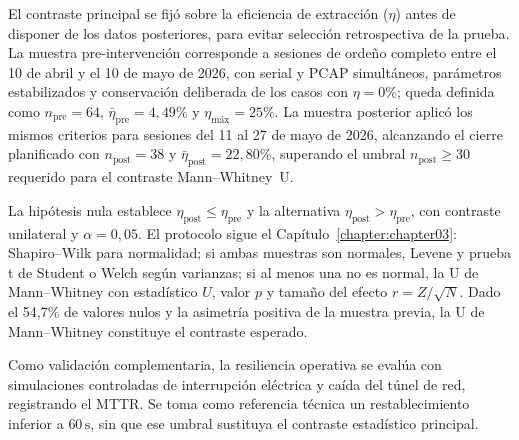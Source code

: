 El contraste principal se fijó sobre la eficiencia de extracción ($\eta$) antes de disponer de los datos posteriores, para evitar selección retrospectiva de la prueba. La muestra pre-intervención corresponde a sesiones de ordeño completo entre el 10 de abril y el 10 de mayo de 2026, con serial y \ac{PCAP} simultáneos, parámetros estabilizados y conservación deliberada de los casos con $\eta = 0\%$; queda definida como $n_{\text{pre}} = 64$, $\bar{\eta}_{\text{pre}} = 4,49\%$ y $\eta_{\text{máx}} = 25\%$. La muestra posterior aplicó los mismos criterios para sesiones del 11 al 27 de mayo de 2026, alcanzando el cierre planificado con $n_{\text{post}} = 38$ y $\bar{\eta}_{\text{post}} = 22,80\%$, superando el umbral $n_{\text{post}} \geq 30$ requerido para el contraste Mann--Whitney~U.

La hipótesis nula establece $\eta_{\text{post}} \leq \eta_{\text{pre}}$ y la alternativa $\eta_{\text{post}} > \eta_{\text{pre}}$, con contraste unilateral y $\alpha = 0{,}05$. El protocolo sigue el Capítulo~\ref{chapter:chapter03}: Shapiro--Wilk para normalidad; si ambas muestras son normales, Levene y prueba t de Student o Welch según varianzas; si al menos una no es normal, la U de Mann--Whitney con estadístico $U$, valor $p$ y tamaño del efecto $r = Z/\sqrt{N}$. Dado el 54,7\% de valores nulos y la asimetría positiva de la muestra previa, la U de Mann--Whitney constituye el contraste esperado.

Como validación complementaria, la resiliencia operativa se evalúa con simulaciones controladas de interrupción eléctrica y caída del túnel de red, registrando el \ac{MTTR}. Se toma como referencia técnica un restablecimiento inferior a $60\,\text{s}$, sin que ese umbral sustituya el contraste estadístico principal.
